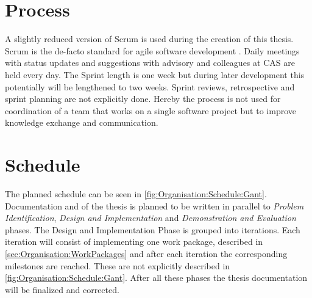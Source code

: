 \section{Process}
\label{sec:Organisation:Process}

A slightly reduced version of Scrum is used during the creation of this thesis. Scrum is the de-facto standard for agile software development \cite{glogerScrumPradigmenwechselIm2010}. Daily meetings with status updates and suggestions with advisory and colleagues at CAS are held every day. The Sprint length is one week but during later development this potentially will be lengthened to two weeks. Sprint reviews, retrospective and sprint planning are not explicitly done. Hereby the process is not used for coordination of a team that works on a single software project but to improve knowledge exchange and communication.

\section{Schedule}
\label{sec:Organisation:Schedule}

The planned schedule can be seen in \ref{fig:Organisation:Schedule:Gant}. Documentation and of the thesis is planned to be written in parallel to  \emph{Problem Identification}, \emph{Design and Implementation} and \emph{Demonstration and Evaluation} phases. The Design and Implementation Phase is grouped into iterations. Each iteration will consist of implementing one work package, described in \ref{sec:Organisation:WorkPackages} and after each iteration the corresponding milestones are reached. These are not explicitly described in \ref{fig:Organisation:Schedule:Gant}. After all these phases the thesis documentation will be finalized and corrected. 

